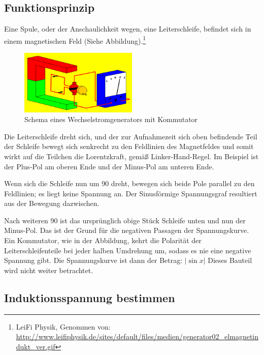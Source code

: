 

\subsection{Funktionsprinzip}

Eine Spule, oder der Anschaulichkeit wegen, eine Leiterschleife, befindet sich in einem magnetischen Feld (Siehe Abbildung).\footnote{LeiFi Physik, Genommen von: \url{http://www.leifiphysik.de/sites/default/files/medien/generator02_elmagnetindukt_ver.gif}}

\begin{figure}[h!]
	\centering
	\includegraphics[width=0.5\textwidth]{Pictures/GeneratorSchema}
	\caption{Schema eines Wechselstromgenerators mit Kommutator} 
\end{figure}



Die Leiterschleife dreht sich, und der zur Aufnahmezeit sich oben befindende Teil der Schleife bewegt sich senkrecht zu den Feldlinien des Magnetfeldes und somit wirkt auf die Teilchen die Lorentzkraft, gemäß Linker-Hand-Regel. Im Beispiel ist der Plus-Pol am oberen Ende und der Minus-Pol am unteren Ende.

Wenn sich die Schleife nun um 90\degree{} dreht, bewegen sich beide Pole parallel zu den Feldlinien; es liegt keine Spannung an. Der Sinusförmige Spannungsgraf resultiert aus der Bewegung dazwischen.

Nach weiteren 90\degree{} ist das ursprünglich obige Stück Schleife unten und nun der Minus-Pol. Das ist der Grund für die negativen Passagen der Spannungskurve. \\
\vspace{11pt}
Ein Kommutator, wie in der Abbildung, kehrt die Polarität der Leiterschleifenteile bei jeder halben Umdrehung um, sodass es nie eine negative Spannung gibt. Die Spannungskurve ist dann der Betrag: $|\sin x|$ Dieses Bauteil wird nicht weiter betrachtet.



\subsection{Induktionsspannung bestimmen}

